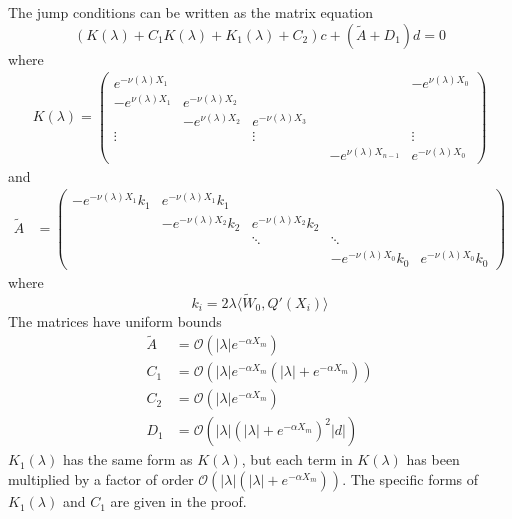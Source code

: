 \documentclass[thesis.tex]{subfiles}
\begin{document}
\begin{lemma}
The jump conditions can be written as the matrix equation
\begin{equation}\label{matrixjumpc}
(K(\lambda) + C_1 K(\lambda) + K_1(\lambda) + C_2) c + (\tilde{A} + D_1) d = 0
\end{equation}
where
\begin{align*}
K(\lambda) =  
\begin{pmatrix}
e^{-\nu(\lambda)X_1} & & & & & -e^{\nu(\lambda)X_0} \\
-e^{\nu(\lambda)X_1} & e^{-\nu(\lambda)X_2} \\
& -e^{\nu(\lambda)X_2} & e^{-\nu(\lambda)X_3} \\
\vdots & & \vdots & &&  \vdots \\
& & & & -e^{\nu(\lambda)X_{n-1}} & e^{-\nu(\lambda)X_0}
\end{pmatrix}
\end{align*}
and
\begin{align*}
\tilde{A} &= \begin{pmatrix}
-e^{-\nu(\lambda)X_1} k_1 & e^{-\nu(\lambda)X_1} k_1 \\
& -e^{-\nu(\lambda)X_2} k_2 & e^{-\nu(\lambda)X_2} k_2 \\
& & \ddots & \ddots \\
& &  & -e^{-\nu(\lambda)X_0} k_0 & e^{-\nu(\lambda)X_0} k_0
\end{pmatrix}
\end{align*}
where 
\begin{equation}\label{defki}
k_i = 2 \lambda \langle \tilde{W}_0, Q'(X_i) \rangle
\end{equation}
The matrices have uniform bounds
\begin{align*}
\tilde{A} &= \mathcal{O}(|\lambda| e^{-\alpha X_m}) \\
C_1 &= \mathcal{O}(|\lambda|e^{-\alpha X_m}(|\lambda| + e^{-\alpha X_m})) \\
C_2 &= \mathcal{O}(|\lambda|e^{-\alpha X_m}) \\
D_1 &= \mathcal{O}(|\lambda|(|\lambda| + e^{-\alpha X_m})^2|d|)
\end{align*}
$K_1(\lambda)$ has the same form as $K(\lambda)$, but each term in $K(\lambda)$ has been multiplied by a factor of order $\mathcal{O}(|\lambda|(|\lambda| + e^{-\alpha X_m}))$. The specific forms of $K_1(\lambda)$ and $C_1$ are given in the proof.


\end{lemma}
\end{document}
